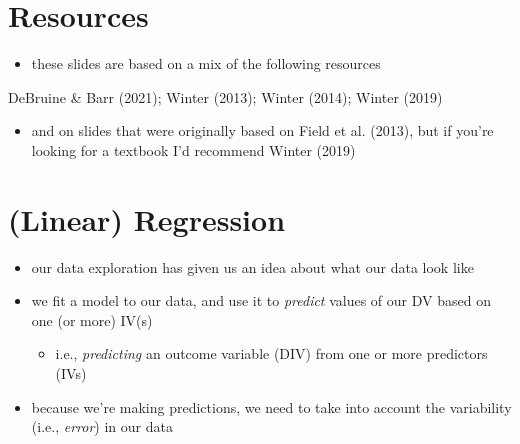 \documentclass[
  letterpaper,
  DIV=11,
  numbers=noendperiod]{scrartcl}
\providecommand{\tightlist}{%
  \setlength{\itemsep}{0pt}\setlength{\parskip}{0pt}}\usepackage{longtable,booktabs,array}
\begin{document}
\hypertarget{resources}{%
\section{Resources}\label{resources}}

\begin{itemize}
\tightlist
\item
  these slides are based on a mix of the following resources
\end{itemize}

DeBruine \& Barr (2021); Winter (2013); Winter (2014); Winter (2019)

\begin{itemize}
\tightlist
\item
  and on slides that were originally based on Field et al. (2013), but
  if you're looking for a textbook I'd recommend Winter (2019)
\end{itemize}

\hypertarget{linear-regression}{%
\section{(Linear) Regression}\label{linear-regression}}

\begin{itemize}
\tightlist
\item
  our data exploration has given us an idea about what our data look
  like
\item
  we fit a model to our data, and use it to \emph{predict} values of our
  DV based on one (or more) IV(s)

  \begin{itemize}
  \tightlist
  \item
    i.e., \emph{predicting} an outcome variable (DIV) from one or more
    predictors (IVs)
  \end{itemize}
\item
  because we're making predictions, we need to take into account the
  variability (i.e., \emph{error}) in our data
\end{itemize}
\end{document}
